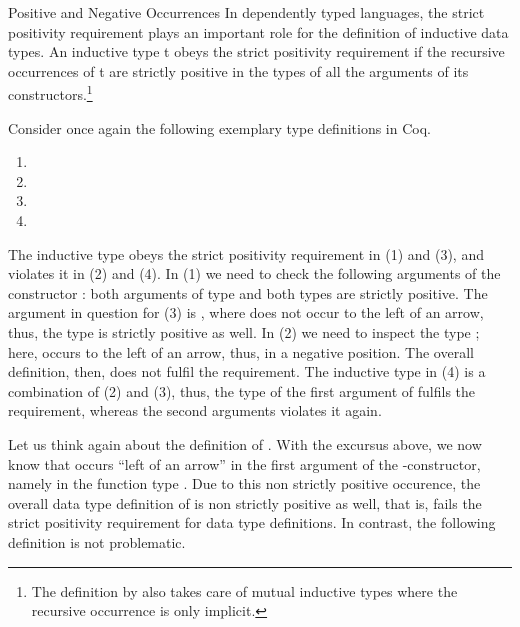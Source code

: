 \begin{excursus}{Positive and Negative Occurrences}
In dependently typed languages, the strict positivity requirement plays an important role for the definition of inductive data types.
An inductive type t obeys the strict positivity requirement if the recursive occurrences of t are strictly positive in the types of all the arguments of its constructors.\footnote{The definition by \citeauthor{blanqui2002inductivedatatype} also takes care of mutual inductive types where the recursive occurrence is only implicit.}

Consider once again the following exemplary type definitions in Coq.

\begin{enumerate}
\item[(1)] 
\item[(2)] 
\item[(3)] 
\item[(4)] 
\end{enumerate}

The inductive type  obeys the strict positivity requirement in (1) and (3), and violates it in (2) and (4).
In (1) we need to check the following arguments of the constructor : both arguments of type  and both types are strictly positive.
The argument in question for (3) is , where  does not occur to the left of an arrow, thus, the type is strictly positive as well.
In (2) we need to inspect the type ; here,  occurs to the left of an arrow, thus, in a negative position.
The overall definition, then, does not fulfil the requirement.
The inductive type in (4) is a combination of (2) and (3), thus, the type of the first argument of  fulfils the requirement, whereas the second arguments violates it again.
\end{excursus}

Let us think again about the definition of .
With the excursus above, we now know that  occurs ``left of an arrow''  in the first argument of the \--constructor, namely in the function type .
Due to this non strictly positive occurence, the overall data type definition of  is non strictly positive as well, that is, fails the strict positivity requirement for data type definitions.
In contrast, the following definition is not problematic.

